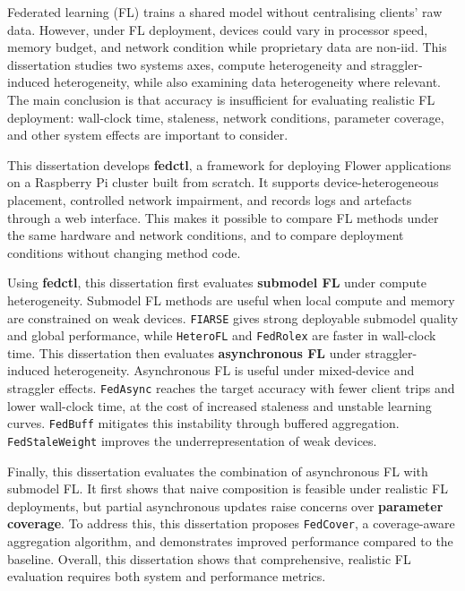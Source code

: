 Federated learning (FL) trains a shared model without centralising clients' raw data. However, under FL deployment, devices could vary in processor speed, memory budget, and network condition while proprietary data are non-iid. This dissertation studies two systems axes, compute heterogeneity and straggler-induced heterogeneity, while also examining data heterogeneity where relevant. The main conclusion is that accuracy is insufficient for evaluating realistic FL deployment: wall-clock time, staleness, network conditions, parameter coverage, and other system effects are important to consider.

This dissertation develops \textbf{fedctl}, a framework for deploying Flower applications on a Raspberry Pi cluster built from scratch. It supports device-heterogeneous placement, controlled network impairment, and records logs and artefacts through a web interface. This makes it possible to compare FL methods under the same hardware and network conditions, and to compare deployment conditions without changing method code.

Using \textbf{fedctl}, this dissertation first evaluates \textbf{submodel FL} under compute heterogeneity. Submodel FL methods are useful when local compute and memory are constrained on weak devices. \texttt{FIARSE} gives strong deployable submodel quality and global performance, while \texttt{HeteroFL} and \texttt{FedRolex} are faster in wall-clock time. This dissertation then evaluates \textbf{asynchronous FL} under straggler-induced heterogeneity. Asynchronous FL is useful under mixed-device and straggler effects. \texttt{FedAsync} reaches the target accuracy with fewer client trips and lower wall-clock time, at the cost of increased staleness and unstable learning curves. \texttt{FedBuff} mitigates this instability through buffered aggregation. \texttt{FedStaleWeight} improves the underrepresentation of weak devices.

Finally, this dissertation evaluates the combination of asynchronous FL with submodel FL. It first shows that naive composition is feasible under realistic FL deployments, but partial asynchronous updates raise concerns over \textbf{parameter coverage}. To address this, this dissertation proposes \texttt{FedCover}, a coverage-aware aggregation algorithm, and demonstrates improved performance compared to the baseline. Overall, this dissertation shows that comprehensive, realistic FL evaluation requires both system and performance metrics.
